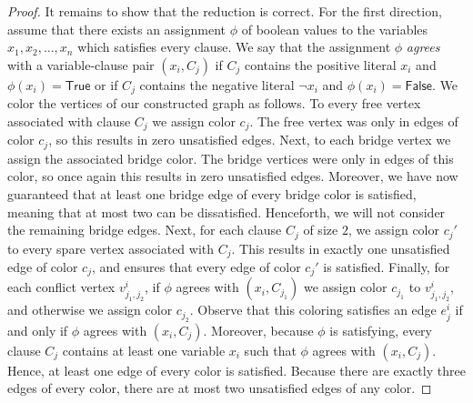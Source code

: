\begin{proof}
    It remains to show that the reduction is correct. For the first direction, assume that there exists an assignment $\phi$ of boolean values to the variables $x_1, x_2, \ldots, x_n$ which satisfies every clause. We say that the assignment $\phi$ \emph{agrees} with a variable-clause pair $(x_i, C_j)$ if $C_j$ contains the positive literal $x_i$ and $\phi(x_i) = \textsf{True}$ or if $C_j$ contains the negative literal $\neg x_i$ and $\phi(x_i) = \textsf{False}$. We color the vertices of our constructed graph as follows.
    To every free vertex associated with clause $C_j$ we assign color $c_j$.
    The free vertex was only in edges of color $c_j$, so this results in zero unsatisfied edges.
    Next, to each bridge vertex we assign the associated bridge color.
    The bridge vertices were only in edges of this color, so once again this results in zero unsatisfied edges.
    Moreover, we have now guaranteed that at least one bridge edge of every bridge color is satisfied, meaning that at most two can be dissatisfied.
    Henceforth, we will not consider the remaining bridge edges.
    Next, for each clause $C_j$ of size $2$, we assign color $c_j'$ to every spare vertex associated with $C_j$. This results in exactly one unsatisfied edge of color $c_j$, and ensures that every edge of color $c_j'$ is satisfied. Finally, for each conflict vertex $v_{j_1, j_2}^i$, if $\phi$ agrees with $(x_i, C_{j_1})$ we assign color $c_{j_1}$ to $v_{j_1, j_2}^i$, and otherwise we assign color $c_{j_2}$.
    Observe that this coloring satisfies an edge $e_j^i$ if and only if $\phi$ agrees with $(x_i, C_j)$.
    Moreover, because $\phi$ is satisfying,
    every clause $C_j$ contains at least one variable $x_i$ such that $\phi$ agrees with $(x_i, C_j)$.
    Hence, at least one edge of every color is satisfied. Because there are exactly three edges of every color, there are at most two unsatisfied edges of any color.


\end{proof}
